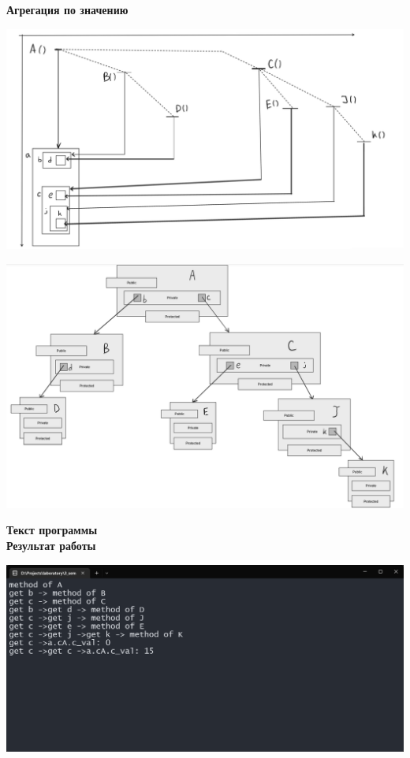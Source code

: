 \documentclass[12pt]{report}
\begin{document}
    \textbf{\large{Агрегация по значению}}\\
    \begin{center}
        \includegraphics[scale=0.5]{formal/screen_1.png}\\  
    \end{center}
    \begin{center}
        \includegraphics[scale=0.5]{formal/screen_2.png}\\  
    \end{center}
    \textbf{Текст программы}\\
    
    \vspace{0.4in}
    \textbf{Результат работы}\\
    \begin{center}
        \includegraphics[scale=0.5]{formal/lab_2_1.png}\\
    \end{center}
\end{document}

